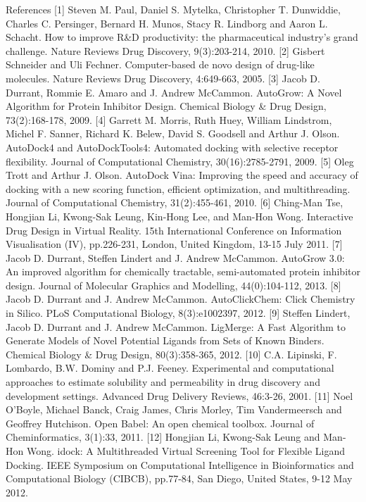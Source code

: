 References
[1] 	Steven M. Paul, Daniel S. Mytelka, Christopher T. Dunwiddie, Charles C. Persinger, Bernard H. Munos, Stacy R. Lindborg and Aaron L. Schacht. How to improve R\&D productivity: the pharmaceutical industry's grand challenge. Nature Reviews Drug Discovery, 9(3):203-214, 2010.
[2] 	Gisbert Schneider and Uli Fechner. Computer-based de novo design of drug-like molecules. Nature Reviews Drug Discovery, 4:649-663, 2005.
[3] 	Jacob D. Durrant, Rommie E. Amaro and J. Andrew McCammon. AutoGrow: A Novel Algorithm for Protein Inhibitor Design. Chemical Biology \& Drug Design, 73(2):168-178, 2009.
[4] 	Garrett M. Morris, Ruth Huey, William Lindstrom, Michel F. Sanner, Richard K. Belew, David S. Goodsell and Arthur J. Olson. AutoDock4 and AutoDockTools4: Automated docking with selective receptor flexibility. Journal of Computational Chemistry, 30(16):2785-2791, 2009.
[5] 	Oleg Trott and Arthur J. Olson. AutoDock Vina: Improving the speed and accuracy of docking with a new scoring function, efficient optimization, and multithreading. Journal of Computational Chemistry, 31(2):455-461, 2010.
[6] 	Ching-Man Tse, Hongjian Li, Kwong-Sak Leung, Kin-Hong Lee, and Man-Hon Wong. Interactive Drug Design in Virtual Reality. 15th International Conference on Information Visualisation (IV), pp.226-231, London, United Kingdom, 13-15 July 2011.
[7] 	Jacob D. Durrant, Steffen Lindert and J. Andrew McCammon. AutoGrow 3.0: An improved algorithm for chemically tractable, semi-automated protein inhibitor design. Journal of Molecular Graphics and Modelling, 44(0):104-112, 2013.
[8] 	Jacob D. Durrant and J. Andrew McCammon. AutoClickChem: Click Chemistry in Silico. PLoS Computational Biology, 8(3):e1002397, 2012.
[9] 	Steffen Lindert, Jacob D. Durrant and J. Andrew McCammon. LigMerge: A Fast Algorithm to Generate Models of Novel Potential Ligands from Sets of Known Binders. Chemical Biology \& Drug Design, 80(3):358-365, 2012.
[10] 	C.A. Lipinski, F. Lombardo, B.W. Dominy and P.J. Feeney. Experimental and computational approaches to estimate solubility and permeability in drug discovery and development settings. Advanced Drug Delivery Reviews, 46:3-26, 2001.
[11] 	Noel O'Boyle, Michael Banck, Craig James, Chris Morley, Tim Vandermeersch and Geoffrey Hutchison. Open Babel: An open chemical toolbox. Journal of Cheminformatics, 3(1):33, 2011.
[12] 	Hongjian Li, Kwong-Sak Leung and Man-Hon Wong. idock: A Multithreaded Virtual Screening Tool for Flexible Ligand Docking. IEEE Symposium on Computational Intelligence in Bioinformatics and Computational Biology (CIBCB), pp.77-84, San Diego, United States, 9-12 May 2012.
